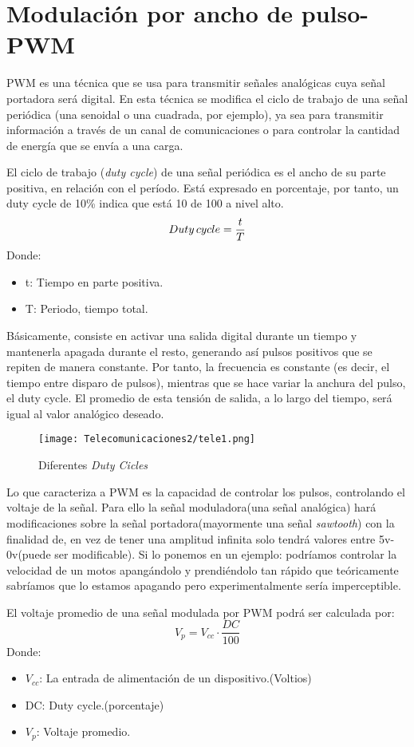 \documentclass[
	12pt, %
	fleqn, %
	a4paper, %
	oneside, %
]{LegrandOrangeBook}
\begin{document}
\section{Modulación por ancho de pulso-PWM}
PWM es una técnica que se usa para transmitir señales analógicas cuya señal portadora será digital. En esta técnica se modifica el ciclo de trabajo de una señal periódica (una senoidal o una cuadrada, por ejemplo), ya sea para transmitir información a través de un canal de comunicaciones o para controlar la cantidad de energía que se envía a una carga.
\begin{definition}
El ciclo de trabajo (\textit{duty cycle}) de una señal periódica es el ancho de su parte positiva, en relación con el período. Está expresado en porcentaje, por tanto, un duty cycle de 10\% indica que está 10 de 100 a nivel alto.
\begin{equation}\label{eq:dutycicle}
Duty\thinspace cycle=\frac{t}{T}
\end{equation}
Donde:
\begin{itemize}
\item t: Tiempo en parte positiva.
\item T: Periodo, tiempo total.
\end{itemize}
\end{definition}
Básicamente, consiste en activar una salida digital durante un tiempo y mantenerla apagada durante el resto, generando así pulsos positivos que se repiten de manera constante. Por tanto, la frecuencia es constante (es decir, el tiempo entre disparo de pulsos), mientras que se hace variar la anchura del pulso, el duty cycle. El promedio de esta tensión de salida, a lo largo del tiempo, será igual al valor analógico deseado.
\begin{figure}[H]
\centering\texttt{[image: Telecomunicaciones2/tele1.png]}
\caption{Diferentes \textit{Duty Cicles}}
\label{fig:dutycycles}
\end{figure}
Lo que caracteriza a PWM es la capacidad de controlar los pulsos, controlando el voltaje de la señal. Para ello la señal moduladora(una señal analógica) hará modificaciones sobre la señal portadora(mayormente una señal \textit{sawtooth}) con la finalidad de, en vez de tener una amplitud infinita solo tendrá valores entre 5v-0v(puede ser modificable). Si lo ponemos en un ejemplo: podríamos  controlar la velocidad de un motos apangándolo y prendiéndolo tan rápido que teóricamente sabríamos que lo estamos apagando pero experimentalmente sería imperceptible.
\begin{definition}
El voltaje promedio de una señal modulada por PWM podrá ser calculada por:
\begin{equation}\label{eq:Vprom}
V_{p}=V_{cc}\cdot\frac{DC}{100}
\end{equation}
Donde:
\begin{itemize}
\item $V_{cc}$: La entrada de alimentación de un dispositivo.(Voltios)
\item DC: Duty cycle.(porcentaje)
\item $V_p$: Voltaje promedio.
\end{itemize}
\end{definition}
\end{document}
